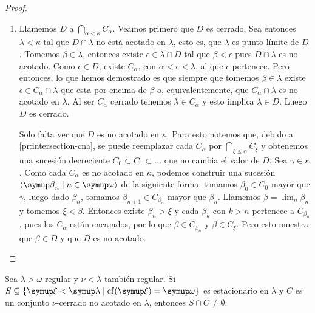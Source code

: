 \begin{proof}
\begin{enumerate}[label=(\roman*)]
        \item Llamemos $D$ a $\dint_{\alpha<\kappa}C_\alpha$. Veamos primero que $D$ es cerrado.
            Sea entonces $\lambda<\kappa$ tal que $D\cap\lambda$
            no está acotado en $\lambda$, esto es, que $\lambda$ es punto límite de $D$.
            Tomemos $\beta\in\lambda$,
            entonces existe $\epsilon\in\lambda\cap D$ tal que $\beta<\epsilon$ pues
            $D\cap\lambda$ es no acotado.
            Como $\epsilon\in D$, existe $C_\alpha$, con $\alpha<\epsilon<\lambda$,
            al que $\epsilon$ pertenece.
            Pero entonces, lo que hemos demostrado es que siempre que tomemos $\beta\in\lambda$
            existe $\epsilon\in C_\alpha\cap\lambda$ que esta por encima de $\beta$ o, equivalentemente,
            que $C_\alpha\cap\lambda$ es no acotado en $\lambda$.
            Al ser $C_\alpha$ cerrado tenemos $\lambda\in C_\alpha$ y esto implica
            $\lambda\in D$. Luego $D$ es cerrado.

            Solo falta ver que $D$ es no acotado en $\kappa$.
            Para esto notemos que, debido a \ref{pr:intersection-cna},
            se puede reemplazar cada $C_\alpha$ por $\bigcap_{\xi\leq\alpha} C_\xi$
            y obtenemos una sucesión decreciente $C_0\subset C_1\subset\dots$
            que no cambia el valor de $D$.
            Sea $\gamma\in\kappa$. Como cada $C_\alpha$ es no acotado en $\kappa$,
            podemos construir una sucesión $\seq{\beta_n\mid n\in\omega}$ de la siguiente forma:
            tomamos $\beta_0\in C_0$ mayor que $\gamma$, luego dado $\beta_n$, tomamos
            $\beta_{n+1} \in C_{\beta_n}$ mayor que $\beta_n$. Llamemos $\beta = \lim_n\beta_n$
            y tomemos $\xi<\beta$. Entonces existe $\beta_n>\xi$ y cada $\beta_k$ con $k>n$
            pertenece a $C_{\beta_n}$, pues los $C_\alpha$ están encajados,
            por lo que $\beta\in C_{\beta_n}$ y $\beta\in C_\xi$.
            Pero esto muestra que $\beta\in D$ y que $D$ es no acotado.
    \end{enumerate}
\end{proof}

\begin{teo}\label{teo:stationary-intersect}
    Sea $\lambda>\omega$ regular y $\nu<\lambda$ también regular.
    Si $S\subseteq\set{\xi<\lambda\mid \cf(\xi)=\omega}$ es estacionario en $\lambda$
    y $C$ es un conjunto $\nu$-cerrado no acotado en $\lambda$, entonces $S\cap C\neq\emptyset$.
\end{teo}


